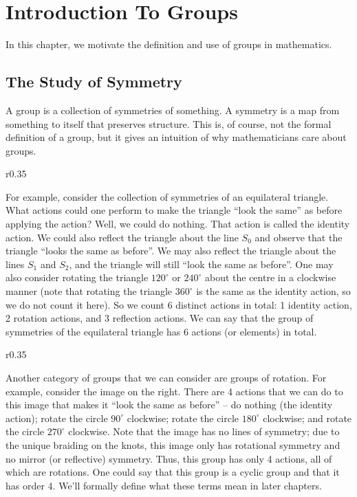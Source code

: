 \chapter{Introduction To Groups}
In this chapter, we motivate the definition and use of groups in mathematics.

\section{The Study of Symmetry}
A group is a collection of symmetries of something. A symmetry is a map from something to itself that preserves structure. This is, of course, not the formal definition of a group, but it gives an intuition of why mathematicians care about groups.

\begin{wrapfigure}{r}{0.35\textwidth}
    \centering
\end{wrapfigure}

For example, consider the collection of symmetries of an equilateral triangle. What actions could one perform to make the triangle ``look the same'' as before applying the action? Well, we could do nothing. That action is called the identity action. We could also reflect the triangle about the line $S_0$ and observe that the triangle ``looks the same as before''. We may also reflect the triangle about the lines $S_1$ and $S_2$, and the triangle will still ``look the same as before''. One may also consider rotating the triangle $120^\circ$ or $240^\circ$ about the centre in a clockwise manner (note that rotating the triangle $360^\circ$ is the same as the identity action, so we do not count it here). So we count 6 distinct actions in total: 1 identity action, 2 rotation actions, and 3 reflection actions. We can say that the group of symmetries of the equilateral triangle has 6 actions (or elements) in total.

\begin{wrapfigure}{r}{0.35\textwidth}
    \centering
\end{wrapfigure}

Another category of groups that we can consider are groups of rotation. For example, consider the image on the right. There are 4 actions that we can do to this image that makes it ``look the same as before'' -- do nothing (the identity action); rotate the circle $90^\circ$ clockwise; rotate the circle $180^\circ$ clockwise; and rotate the circle $270^\circ$ clockwise. Note that the image has no lines of symmetry; due to the unique braiding on the knots, this image only has rotational symmetry and no mirror (or reflective) symmetry. Thus, this group has only 4 actions, all of which are rotations. One could say that this group is a cyclic group and that it has order 4. We'll formally define what these terms mean in later chapters.

